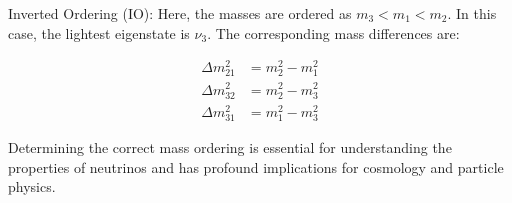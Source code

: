 Inverted Ordering (IO): Here, the masses are ordered as \( m_3 < m_1 < m_2 \).
In this case, the lightest eigenstate is $\nu_3$.
The corresponding mass differences are:

\begin{align}
  \Delta m_{21}^2 &= m_2^2 - m_1^2 \\
  \Delta m_{32}^2 &= m_2^2 - m_3^2 \\
  \Delta m_{31}^2 &= m_1^2 - m_3^2
\end{align}

Determining the correct mass ordering is essential for understanding the properties of neutrinos and has profound implications for cosmology and particle physics.
